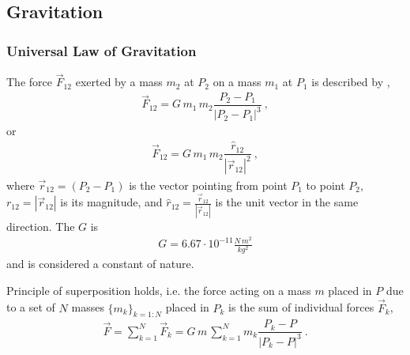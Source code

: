 \documentclass[letterpaper,10pt,english]{jupyterBook}
\begin{document}
\subsection{Gravitation}
\label{\detokenize{ch/actions-examples:gravitation}}\label{\detokenize{ch/actions-examples:classical-mechanics-actions-gravitation}}

\subsubsection{Universal Law of Gravitation}
\label{\detokenize{ch/actions-examples:universal-law-of-gravitation}}\label{\detokenize{ch/actions-examples:classical-mechanics-actions-gravitation-newton}}
\sphinxAtStartPar
The force \(\vec{F}_{12}\) exerted by a mass \(m_2\) at \(P_2\) on a mass \(m_1\) at \(P_1\) is described by ,
\begin{equation*}
\begin{split}\vec{F}_{12} = G \, m_1 \, m_2 \dfrac{P_2 - P_1}{|P_2 - P_1|^3} \ ,\end{split}
\end{equation*}
\sphinxAtStartPar
or
\begin{equation*}
\begin{split}\vec{F}_{12} = G \, m_1 \, m_2 \dfrac{\hat{r}_{12}}{|\vec{r}_{12}|^2} \ ,\end{split}
\end{equation*}
\sphinxAtStartPar
where \(\vec{r}_{12} = (P_2 - P_1)\) is the vector pointing from point \(P_1\) to point \(P_2\), \(r_{12} = |\vec{r}_{12}|\) is its magnitude, and \(\hat{r}_{12} = \frac{\vec{r}_{12}}{|\vec{r}_{12}|}\) is the unit vector in the same direction. The  \(G\) is
\begin{equation*}
\begin{split}G = 6.67 \cdot 10^{-11} \frac{N \, m^2}{kg^2}\end{split}
\end{equation*}
\sphinxAtStartPar
and is considered a constant of nature.

\sphinxAtStartPar
{} Principle of superposition holds, i.e. the force acting on a mass \(m\) placed in \(P\) due to a set of \(N\) masses \(\{ m_k \}_{k=1:N}\) placed in \(P_k\) is the sum of individual forces \(\vec{F}_{k}\),
\begin{equation}\label{equation:ch/actions-examples:eq:gravitation:force:psce}
\begin{split}\vec{F} = \sum_{k=1}^N \vec{F}_{k} = G \, m \, \sum_{k=1}^N m_k \dfrac{P_k - P}{|P_k - P|^3} \ .\end{split}
\end{equation}
\end{document}
